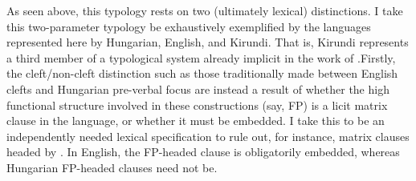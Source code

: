 \documentclass[12pt]{article}
\begin{document}
\bex
\ex\label{ex:typology-struc}\bxl
{}
\fxl
\fex

As seen above, this typology rests on two (ultimately lexical) distinctions. I take this two-parameter typology be exhaustively exemplified by the languages represented here by Hungarian, English, and Kirundi. That is, Kirundi represents a third member of a typological system already implicit in the work of \citet{ekiss-1998}.Firstly, the cleft/non-cleft distinction such as those traditionally made between English clefts and Hungarian pre-verbal focus are instead a result of whether the high functional structure involved in these constructions (say, FP) is a licit matrix clause in the language, or whether it must be embedded. I take this to be an independently needed lexical specification to rule out, for instance, matrix clauses headed by . In English, the FP-headed clause is obligatorily embedded, whereas Hungarian FP-headed clauses need not be. 
\end{document}
